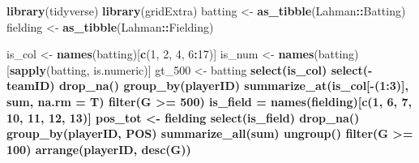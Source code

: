 \documentclass[]{book}
\newenvironment{Shaded}{\begin{snugshade}}{\end{snugshade}}
\newcommand{\KeywordTok}[1]{\textcolor[rgb]{0.13,0.29,0.53}{\textbf{#1}}}
\newcommand{\DataTypeTok}[1]{\textcolor[rgb]{0.13,0.29,0.53}{#1}}
\newcommand{\DecValTok}[1]{\textcolor[rgb]{0.00,0.00,0.81}{#1}}
\newcommand{\StringTok}[1]{\textcolor[rgb]{0.31,0.60,0.02}{#1}}
\newcommand{\OperatorTok}[1]{\textcolor[rgb]{0.81,0.36,0.00}{\textbf{#1}}}
\newcommand{\NormalTok}[1]{#1}
\begin{document}
\begin{Shaded}
\begin{Highlighting}[]
\KeywordTok{library}\NormalTok{(tidyverse)}
\KeywordTok{library}\NormalTok{(gridExtra)}
\NormalTok{batting <-}\StringTok{ }\KeywordTok{as_tibble}\NormalTok{(Lahman}\OperatorTok{::}\NormalTok{Batting)}
\NormalTok{fielding <-}\StringTok{ }\KeywordTok{as_tibble}\NormalTok{(Lahman}\OperatorTok{::}\NormalTok{Fielding)}

\NormalTok{is_col <-}\StringTok{ }\KeywordTok{names}\NormalTok{(batting)[}\KeywordTok{c}\NormalTok{(}\DecValTok{1}\NormalTok{, }\DecValTok{2}\NormalTok{, }\DecValTok{4}\NormalTok{, }\DecValTok{6}\OperatorTok{:}\DecValTok{17}\NormalTok{)]}
\NormalTok{is_num <-}\StringTok{ }\KeywordTok{names}\NormalTok{(batting)[}\KeywordTok{sapply}\NormalTok{(batting, is.numeric)]}
\NormalTok{gt_}\DecValTok{500}\NormalTok{ <-}\StringTok{ }\NormalTok{batting }\OperatorTok{%>%}
\StringTok{  }\KeywordTok{select}\NormalTok{(is_col) }\OperatorTok{%>%}
\StringTok{  }\KeywordTok{select}\NormalTok{(}\OperatorTok{-}\NormalTok{teamID) }\OperatorTok{%>%}\StringTok{ }
\StringTok{  }\KeywordTok{drop_na}\NormalTok{() }\OperatorTok{%>%}
\StringTok{  }\KeywordTok{group_by}\NormalTok{(playerID) }\OperatorTok{%>%}\StringTok{ }
\StringTok{  }\KeywordTok{summarize_at}\NormalTok{(is_col[}\OperatorTok{-}\NormalTok{(}\DecValTok{1}\OperatorTok{:}\DecValTok{3}\NormalTok{)], sum, }\DataTypeTok{na.rm =}\NormalTok{ T) }\OperatorTok{%>%}\StringTok{ }
\StringTok{  }\KeywordTok{filter}\NormalTok{(G }\OperatorTok{>=}\StringTok{ }\DecValTok{500}\NormalTok{)}
\NormalTok{is_field =}\StringTok{ }\KeywordTok{names}\NormalTok{(fielding)[}\KeywordTok{c}\NormalTok{(}\DecValTok{1}\NormalTok{, }\DecValTok{6}\NormalTok{, }\DecValTok{7}\NormalTok{, }\DecValTok{10}\NormalTok{, }\DecValTok{11}\NormalTok{, }\DecValTok{12}\NormalTok{, }\DecValTok{13}\NormalTok{)]}
\NormalTok{pos_tot <-}\StringTok{ }\NormalTok{fielding }\OperatorTok{%>%}
\StringTok{  }\KeywordTok{select}\NormalTok{(is_field) }\OperatorTok{%>%}\StringTok{ }
\StringTok{  }\KeywordTok{drop_na}\NormalTok{() }\OperatorTok{%>%}\StringTok{ }
\StringTok{  }\KeywordTok{group_by}\NormalTok{(playerID, POS) }\OperatorTok{%>%}
\StringTok{  }\KeywordTok{summarize_all}\NormalTok{(sum) }\OperatorTok{%>%}
\StringTok{  }\KeywordTok{ungroup}\NormalTok{() }\OperatorTok{%>%}\StringTok{ }
\StringTok{  }\KeywordTok{filter}\NormalTok{(G }\OperatorTok{>=}\StringTok{ }\DecValTok{100}\NormalTok{) }\OperatorTok{%>%}\StringTok{ }
\StringTok{  }\KeywordTok{arrange}\NormalTok{(playerID, }\KeywordTok{desc}\NormalTok{(G)) }\OperatorTok{%>%}
}}}}}}}}}}}}}}
\end{Highlighting}
\end{Shaded}
\end{document}
